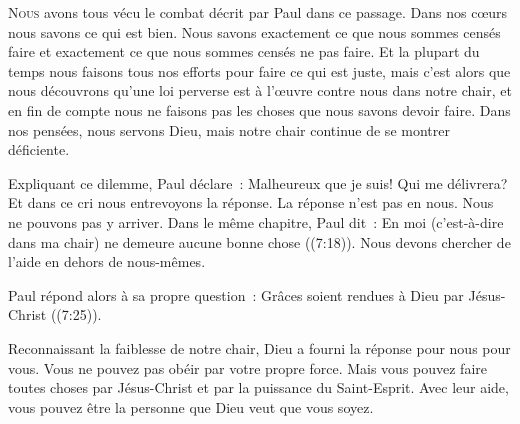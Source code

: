 


\lettrine{N}{ous} avons tous vécu le combat décrit par Paul dans ce passage.
 Dans nos c\oe{}urs nous savons ce qui est bien.
 Nous savons exactement ce que nous sommes censés faire
 et exactement ce que nous sommes censés ne pas faire.
 Et la plupart du temps nous faisons tous nos efforts pour faire
 ce qui est juste, mais c'est alors que nous découvrons qu'une loi perverse
 est à l'\oe{}uvre contre nous dans notre chair,
 et en fin de compte nous ne faisons pas les choses
 que nous savons devoir faire.
 Dans nos pensées, nous servons Dieu,
 mais notre chair continue de se montrer déficiente.

Expliquant ce dilemme, Paul déclare~: 
 \Og Malheureux que je suis! Qui me délivrera? \Fg{}
 Et dans ce cri nous entrevoyons la réponse. La réponse n'est pas en nous.
 Nous ne pouvons pas y arriver. Dans le même chapitre, 
 Paul dit~: 
 \Og En moi (c'est-à-dire dans ma chair) ne demeure aucune bonne chose \Fg{}
 ((7:18)).
 Nous devons chercher de l'aide en dehors de nous-mêmes.

Paul répond alors à sa propre question~: 
 \Og Grâces soient rendues à Dieu par Jésus-Christ \Fg{}
 ((7:25)).

Reconnaissant la faiblesse de notre chair, Dieu a fourni la réponse
 pour nous \ocadr pour vous. Vous ne pouvez pas obéir par votre propre force.
 Mais vous pouvez faire toutes choses par Jésus-Christ et par la puissance
 du Saint-Esprit. Avec leur aide, vous pouvez être la personne que Dieu
 veut que vous soyez.

\dvrule






